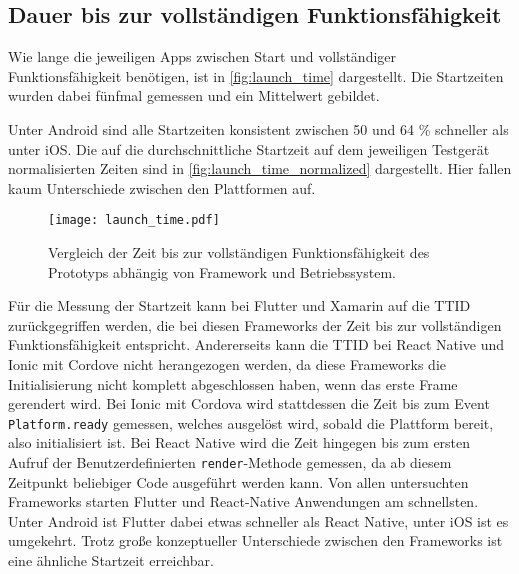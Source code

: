 \subsection{Dauer bis zur vollständigen Funktionsfähigkeit}

Wie lange die jeweiligen Apps zwischen Start und vollständiger Funktionsfähigkeit benötigen, ist in \autoref{fig:launch_time} dargestellt.
Die Startzeiten wurden dabei fünfmal gemessen und ein Mittelwert gebildet.

Unter Android sind alle Startzeiten konsistent zwischen 50 und 64 \% schneller als unter iOS.
Die auf die durchschnittliche Startzeit auf dem jeweiligen Testgerät normalisierten Zeiten sind in \autoref{fig:launch_time_normalized} dargestellt.
Hier fallen kaum Unterschiede zwischen den Plattformen auf.
\begin{figure}[ht]
  \centering 
  \texttt{[image: launch\_time.pdf]}
  \caption{Vergleich der Zeit bis zur vollständigen Funktionsfähigkeit des Prototyps abhängig von Framework und Betriebssystem.}
  \label{fig:launch_time}
\end{figure}


Für die Messung der Startzeit kann bei Flutter und Xamarin auf die \ac{TTID} zurückgegriffen werden, die bei diesen Frameworks der Zeit bis zur vollständigen Funktionsfähigkeit entspricht.
Andererseits kann die \ac{TTID} bei React Native und Ionic mit Cordove nicht herangezogen werden, da diese Frameworks die Initialisierung nicht komplett abgeschlossen haben, wenn das erste Frame gerendert wird.
Bei Ionic mit Cordova wird stattdessen die Zeit bis zum Event \texttt{Platform.ready} gemessen, welches ausgelöst wird, sobald die Plattform bereit, also initialisiert ist.
Bei React Native wird die Zeit hingegen bis zum ersten Aufruf der Benutzerdefinierten \texttt{render}-Methode gemessen, da ab diesem Zeitpunkt beliebiger Code ausgeführt werden kann.
Von allen untersuchten Frameworks starten Flutter und React-Native Anwendungen am schnellsten.
Unter Android ist Flutter dabei etwas schneller als React Native, unter iOS ist es umgekehrt.
Trotz große konzeptueller Unterschiede zwischen den Frameworks ist eine ähnliche Startzeit erreichbar.


